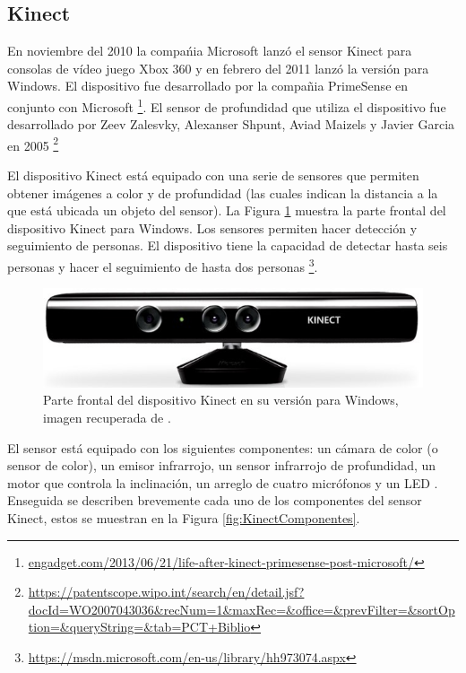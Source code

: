 \subsection{Kinect}

En noviembre del 2010 la compa\'nia Microsoft lanz\'o el sensor Kinect para consolas de vídeo juego Xbox 360 y en febrero del 2011 lanz\'o la versi\'on para Windows. El dispositivo fue desarrollado por la compa\~nia PrimeSense en conjunto con Microsoft \footnote{\url{engadget.com/2013/06/21/life-after-kinect-primesense-post-microsoft/}}. El sensor de profundidad que utiliza el dispositivo fue desarrollado por Zeev Zalesvky, Alexanser Shpunt, Aviad Maizels y Javier Garcia en 2005 \footnote{\url{https://patentscope.wipo.int/search/en/detail.jsf?docId=WO2007043036&recNum=1&maxRec=&office=&prevFilter=&sortOption=&queryString=&tab=PCT+Biblio}}   


El dispositivo Kinect está equipado con una serie de sensores que permiten obtener imágenes a color y de profundidad (las cuales indican la distancia a la que está ubicada un objeto del sensor). La Figura \ref{fig:KinectPic} muestra la parte frontal del dispositivo Kinect para Windows. Los sensores permiten hacer detección y seguimiento de personas. El dispositivo tiene la capacidad de detectar hasta seis personas y hacer el seguimiento de hasta dos personas \footnote{\url{https://msdn.microsoft.com/en-us/library/hh973074.aspx}}.    
  
\begin{figure}[h!]
\begin{center}
\includegraphics[scale=.65]{./Figures/Kinect.jpg}
\end{center}
\caption{Parte frontal del dispositivo Kinect en su versión para Windows, imagen recuperada de \footnotemark{}.} 
\label{fig:KinectPic}
\end{figure} 


El sensor está equipado con los siguientes componentes: un cámara de color (o sensor de color), un emisor infrarrojo, un sensor infrarrojo de profundidad, un motor que controla la inclinación, un arreglo de cuatro micrófonos y un LED \citep{Jana2013}.
Enseguida se describen brevemente cada uno de los componentes del sensor Kinect, estos se muestran en la Figura \ref{fig:KinectComponentes}. 

